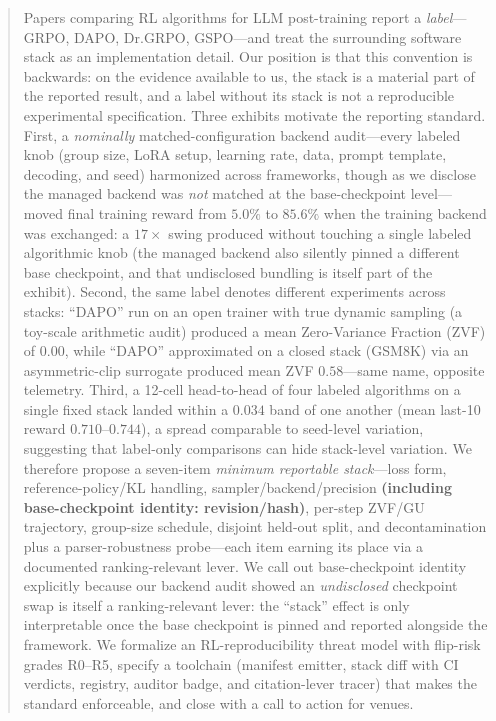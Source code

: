 \begin{abstract}
Papers comparing RL algorithms for LLM post-training report a \emph{label}---GRPO,
DAPO, Dr.GRPO, GSPO---and treat the surrounding software stack as an
implementation detail. Our position is that this convention is backwards: on the
evidence available to us, the stack is a material part of the reported result,
and a label without its stack is not a reproducible experimental
specification. Three exhibits motivate the reporting standard. First, a \emph{nominally} matched-configuration backend
audit---every labeled knob (group size, LoRA setup, learning rate, data, prompt
template, decoding, and seed) harmonized across frameworks, though as we disclose
the managed backend was \emph{not} matched at the base-checkpoint level---moved
final training reward from $5.0\%$ to $85.6\%$ when the training backend was exchanged: a $17\times$ swing
produced without touching a single labeled algorithmic knob (the managed backend
also silently pinned a different base checkpoint, and that undisclosed bundling
is itself part of the exhibit). Second, the same label denotes different
experiments across stacks: ``DAPO'' run on an open trainer with true dynamic
sampling (a toy-scale arithmetic audit) produced a mean Zero-Variance Fraction
(ZVF) of $0.00$, while ``DAPO'' approximated on a closed stack (GSM8K) via an
asymmetric-clip surrogate produced mean ZVF $0.58$---same name, opposite
telemetry. Third, a 12-cell head-to-head of four labeled algorithms on a single
fixed stack landed within a $0.034$ band of one another (mean last-10 reward
$0.710$--$0.744$), a spread comparable to seed-level variation, suggesting
that label-only comparisons can hide stack-level variation. We therefore
propose a seven-item \emph{minimum reportable
stack}---loss form, reference-policy/KL handling, sampler/backend/precision
\textbf{(including base-checkpoint identity: revision/hash)}, per-step ZVF/GU
trajectory, group-size schedule, disjoint held-out split, and
decontamination plus a parser-robustness probe---each item earning its place via a
documented ranking-relevant lever. We call out base-checkpoint identity explicitly
because our backend audit showed an \emph{undisclosed} checkpoint swap is itself a
ranking-relevant lever: the ``stack'' effect is only interpretable once the base
checkpoint is pinned and reported alongside the framework. We formalize an RL-reproducibility threat
model with flip-risk grades R0--R5, specify a toolchain (manifest emitter, stack
diff with CI verdicts, registry, auditor badge, and citation-lever tracer) that
makes the standard enforceable, and close with a call to action for venues.
\end{abstract}
